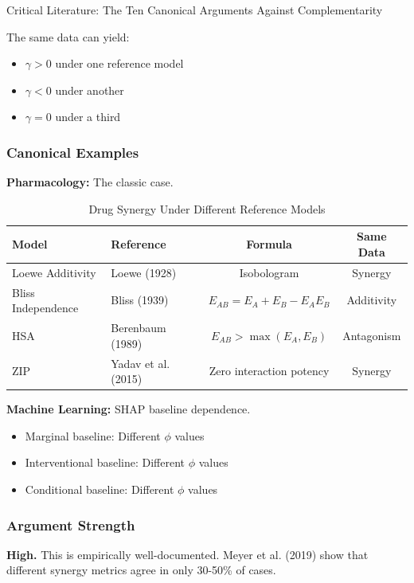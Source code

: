 \begin{chapter}{Critical Literature: The Ten Canonical Arguments Against Complementarity}
\begin{tcolorbox}[colback=red!5!white,colframe=red!75!black,title=\textbf{Core Claim}]
The same data can yield:
\begin{itemize}[noitemsep]
    \item $\gamma > 0$ under one reference model
    \item $\gamma < 0$ under another
    \item $\gamma = 0$ under a third
\end{itemize}
\end{tcolorbox}

\subsubsection{Canonical Examples}

\textbf{Pharmacology:} The classic case.

\begin{table}[h]
\centering
\caption{Drug Synergy Under Different Reference Models}
\label{tab:drug-synergy-models}
\renewcommand{\arraystretch}{1.3}
\begin{tabular}{@{}llcc@{}}
\toprule
\textbf{Model} & \textbf{Reference} & \textbf{Formula} & \textbf{Same Data} \\
\midrule
Loewe Additivity & Loewe (1928) & Isobologram & Synergy \\
Bliss Independence & Bliss (1939) & $E_{AB} = E_A + E_B - E_A E_B$ & Additivity \\
HSA & Berenbaum (1989) & $E_{AB} > \max(E_A, E_B)$ & Antagonism \\
ZIP & Yadav et al. (2015) & Zero interaction potency & Synergy \\
\bottomrule
\end{tabular}
\end{table}

\textbf{Machine Learning:} SHAP baseline dependence.

\begin{itemize}[noitemsep]
    \item Marginal baseline: Different $\phi$ values
    \item Interventional baseline: Different $\phi$ values
    \item Conditional baseline: Different $\phi$ values
\end{itemize}

\subsubsection{Argument Strength}

\textbf{High.} This is empirically well-documented. Meyer et al. (2019) show that different synergy metrics agree in only 30-50\% of cases.


\end{chapter}
